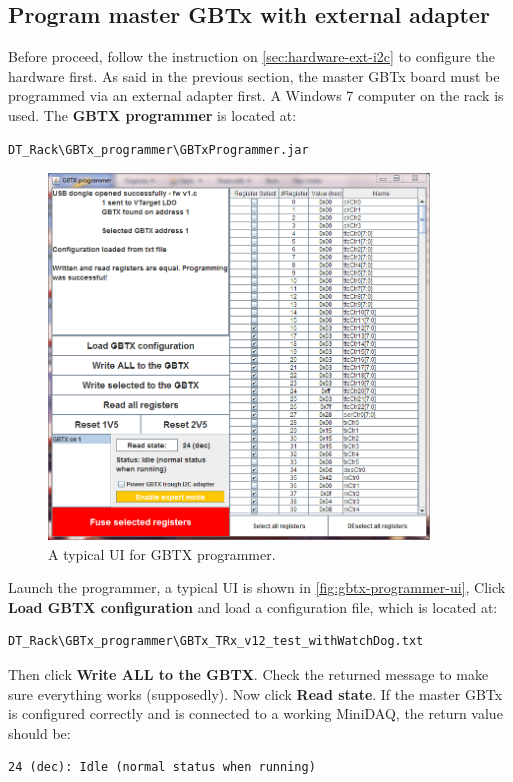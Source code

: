 \subsection{Program master GBTx with external \itwoc adapter}
Before proceed, follow the instruction on \autoref{sec:hardware-ext-i2c} to
configure the hardware first.
As said in the previous section, the master GBTx board must be programmed via an
external \itwoc adapter first.
A Windows 7 computer on the rack is used. The \textbf{GBTX programmer} is
located at:

\begin{lstlisting}
DT_Rack\GBTx_programmer\GBTxProgrammer.jar
\end{lstlisting}

\begin{figure}[ht]
    \centering
    \includegraphics[width=0.9\textwidth]{res/gbtx_programmer_v1_ui.png}
    \caption{A typical UI for GBTX programmer.}
    \label{fig:gbtx-programmer-ui}
\end{figure}

Launch the programmer, a typical UI is shown in
\autoref{fig:gbtx-programmer-ui},
Click \textbf{Load GBTX configuration} and load a configuration file, which is
located at:

\begin{lstlisting}
DT_Rack\GBTx_programmer\GBTx_TRx_v12_test_withWatchDog.txt
\end{lstlisting}

Then click \textbf{Write ALL to the GBTX}. Check the returned message to make
sure everything works (supposedly).
Now click \textbf{Read state}.
If the master GBTx is configured correctly and is connected to a working
MiniDAQ, the return value should be:

\begin{lstlisting}
24 (dec): Idle (normal status when running)
\end{lstlisting}
